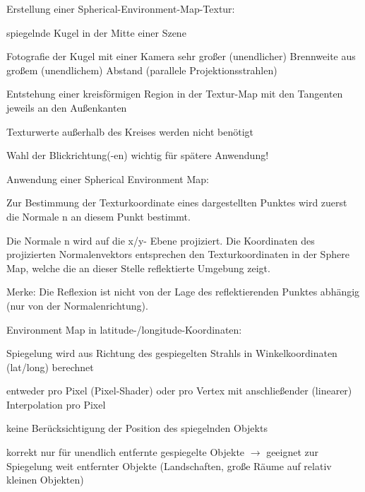 \documentclass[landscape]{article}
\begin{document}
\begin{multicols}{3}
  
  Erstellung einer Spherical-Environment-Map-Textur:
  \begin{itemize*}
    \item spiegelnde Kugel in der Mitte einer Szene
    \item Fotografie der Kugel mit einer Kamera sehr großer (unendlicher) Brennweite aus großem (unendlichem) Abstand (parallele Projektionsstrahlen)
    \item Entstehung einer kreisförmigen Region in der Textur-Map mit den Tangenten jeweils an den Außenkanten
    \item Texturwerte außerhalb des Kreises werden nicht benötigt
    \item Wahl der Blickrichtung(-en) wichtig für spätere Anwendung!
  \end{itemize*}
  
  Anwendung einer Spherical Environment Map:
  \begin{itemize*}
    \item Zur Bestimmung der Texturkoordinate eines dargestellten Punktes wird zuerst die Normale n an diesem Punkt bestimmt.
    \item Die Normale n wird auf die x/y- Ebene projiziert. Die Koordinaten des projizierten Normalenvektors entsprechen den Texturkoordinaten in der Sphere Map, welche die an dieser Stelle reflektierte Umgebung zeigt.
    \item Merke: Die Reflexion ist nicht von der Lage des reflektierenden Punktes abhängig (nur von der Normalenrichtung).
  \end{itemize*}
  
  Environment Map in latitude-/longitude-Koordinaten:
  \begin{itemize*}
    \item Spiegelung wird aus Richtung des gespiegelten Strahls in Winkelkoordinaten (lat/long) berechnet
    \item entweder pro Pixel (Pixel-Shader) oder pro Vertex mit anschließender (linearer) Interpolation pro Pixel
    \item keine Berücksichtigung der Position des spiegelnden Objekts
    \item korrekt nur für unendlich entfernte gespiegelte Objekte $\rightarrow$ geeignet zur Spiegelung weit entfernter Objekte (Landschaften, große Räume auf relativ kleinen Objekten)
  \end{itemize*}
  

\end{multicols}
\end{document}
